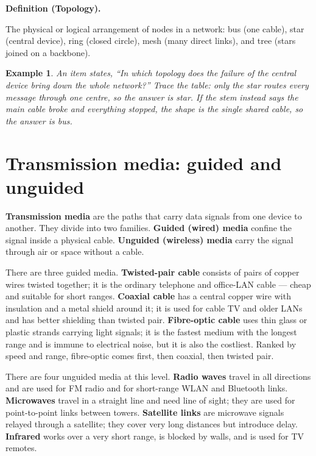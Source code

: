 \documentclass[11pt]{article}
\newtheorem{example}{Example}[section]
\newenvironment{definitionbox}[1]{%
  \par\noindent\textbf{Definition (#1).}\ \itshape
}{\par\vspace{0.3em}}
\begin{document}
\begin{definitionbox}{Topology}
The physical or logical arrangement of nodes in a network: bus (one cable),
star (central device), ring (closed circle), mesh (many direct links), and
tree (stars joined on a backbone).
\end{definitionbox}

\begin{example}
An item states, ``In which topology does the failure of the central device
bring down the whole network?'' Trace the table: only the star routes every
message through one centre, so the answer is star. If the stem instead says
the main cable broke and everything stopped, the shape is the single shared
cable, so the answer is bus.
\end{example}

\section{Transmission media: guided and unguided}
\textbf{Transmission media} are the paths that carry data signals from one
device to another. They divide into two families. \textbf{Guided (wired)
media} confine the signal inside a physical cable. \textbf{Unguided
(wireless) media} carry the signal through air or space without a cable.

There are three guided media. \textbf{Twisted-pair cable} consists of pairs
of copper wires twisted together; it is the ordinary telephone and office-LAN
cable --- cheap and suitable for short ranges. \textbf{Coaxial cable} has a
central copper wire with insulation and a metal shield around it; it is used
for cable TV and older LANs and has better shielding than twisted pair.
\textbf{Fibre-optic cable} uses thin glass or plastic strands carrying light
signals; it is the fastest medium with the longest range and is immune to
electrical noise, but it is also the costliest. Ranked by speed and range,
fibre-optic comes first, then coaxial, then twisted pair.

There are four unguided media at this level. \textbf{Radio waves} travel in
all directions and are used for FM radio and for short-range WLAN and
Bluetooth links. \textbf{Microwaves} travel in a straight line and need line
of sight; they are used for point-to-point links between towers.
\textbf{Satellite links} are microwave signals relayed through a satellite;
they cover very long distances but introduce delay. \textbf{Infrared} works
over a very short range, is blocked by walls, and is used for TV remotes.
\end{document}
